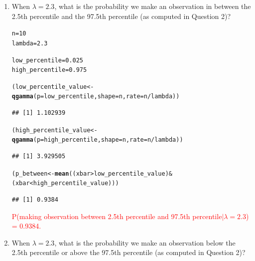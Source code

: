 \documentclass{article}\usepackage[]{graphicx}\usepackage[]{xcolor}
\makeatletter
\newcommand{\hlnum}[1]{\textcolor[rgb]{0.686,0.059,0.569}{#1}}%
\newcommand{\hlopt}[1]{\textcolor[rgb]{0,0,0}{#1}}%
\newcommand{\hldef}[1]{\textcolor[rgb]{0.345,0.345,0.345}{#1}}%
\newcommand{\hlkwb}[1]{\textcolor[rgb]{0.69,0.353,0.396}{#1}}%
\newcommand{\hlkwc}[1]{\textcolor[rgb]{0.333,0.667,0.333}{#1}}%
\newcommand{\hlkwd}[1]{\textcolor[rgb]{0.737,0.353,0.396}{\textbf{#1}}}%
\newenvironment{kframe}{%
 \def\at@end@of@kframe{}%
 \ifinner\ifhmode%
  \def\at@end@of@kframe{\end{minipage}}%
  \begin{minipage}{\columnwidth}%
 \fi\fi%
 \def\FrameCommand##1{\hskip\@totalleftmargin \hskip-\fboxsep
 \colorbox{shadecolor}{##1}\hskip-\fboxsep
     \hskip-\linewidth \hskip-\@totalleftmargin \hskip\columnwidth}%
 \MakeFramed {\advance\hsize-\width
   \@totalleftmargin\z@ \linewidth\hsize
   \@setminipage}}%
 {\par\unskip\endMakeFramed%
 \at@end@of@kframe}
\newenvironment{knitrout}{}{} %
\makeatother
\begin{document}
\begin{enumerate}
\begin{enumerate}
\textcolor{red}{P(making an observation below the 2.5th percentile or above the 97.5th percentile$\vert \lambda = 2$) = 0.0492.}
    
    \item When $\lambda=2.3$, what is the probability we make an observation in between the 2.5th percentile and the 97.5th percentile (as computed in Question 2)? 
    
\begin{knitrout}\scriptsize
{}\color{fgcolor}\begin{kframe}
\begin{alltt}
\hldef{n} \hlkwb{=} \hlnum{10}
\hldef{lambda} \hlkwb{=} \hlnum{2.3}

\hldef{low_percentile} \hlkwb{=} \hlnum{0.025}
\hldef{high_percentile} \hlkwb{=} \hlnum{0.975}

\hldef{(low_percentile_value} \hlkwb{<-} \hlkwd{qgamma}\hldef{(}\hlkwc{p} \hldef{= low_percentile,} \hlkwc{shape} \hldef{= n,} \hlkwc{rate} \hldef{= n}\hlopt{/}\hldef{lambda))}
\end{alltt}
\begin{verbatim}
## [1] 1.102939
\end{verbatim}
\begin{alltt}
\hldef{(high_percentile_value} \hlkwb{<-} \hlkwd{qgamma}\hldef{(}\hlkwc{p} \hldef{= high_percentile,} \hlkwc{shape} \hldef{= n,} \hlkwc{rate} \hldef{= n}\hlopt{/}\hldef{lambda))}
\end{alltt}
\begin{verbatim}
## [1] 3.929505
\end{verbatim}
\begin{alltt}
\hldef{(p_between} \hlkwb{<-} \hlkwd{mean}\hldef{((xbar}\hlopt{>}\hldef{low_percentile_value)} \hlopt{&} \hldef{(xbar}\hlopt{<}\hldef{high_percentile_value)))}
\end{alltt}
\begin{verbatim}
## [1] 0.9384
\end{verbatim}
\end{kframe}
\end{knitrout}
    
    \textcolor{red}{P(making observation between 2.5th percentile and 97.5th percentile$\vert \lambda = 2.3$) = 0.9384.}
    
    \item When $\lambda=2.3$, what is the probability we make an observation below the 2.5th percentile or above the 97.5th percentile (as computed 
    in Question 2)? 
    

\end{enumerate}
\end{enumerate}
\end{document}
